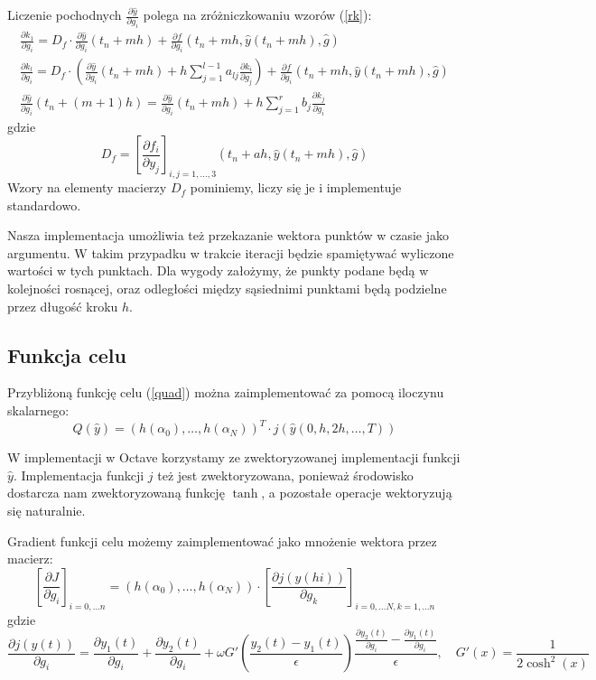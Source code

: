 \documentclass[11pt]{article}
\begin{document}
Liczenie pochodnych $\frac{\partial \hat{y}}{\partial g_i}$ polega na zróżniczkowaniu wzorów (\ref{rk}):
\begin{gather}
    \frac{\partial k_1}{\partial g_i} = D_f \cdot \frac{\partial \hat{y}}{\partial g_i}(t_n + mh) + \frac{\partial f}{\partial g_i}(t_n + mh, \hat{y}(t_n + mh), \hat{g}) \nonumber \\
    \frac{\partial k_l}{\partial g_i}  = D_f \cdot \left(\frac{\partial \hat{y}}{\partial g_i}(t_n + mh) + h\sum_{j=1}^{l-1} a_{lj}\frac{\partial k_i}{\partial g_j} \right) + \frac{\partial f}{\partial g_i}(t_n + mh, \hat{y}(t_n + mh), \hat{g})  \label{drk}\\
    \frac{\partial \hat{y}}{\partial g_i}(t_n + (m+1)h) = \frac{\partial \hat{y}}{\partial g_i}(t_n + mh) + h\sum_{j=1}^r b_j \frac{\partial k_j}{\partial g_i} \nonumber
\end{gather}
gdzie
\begin{equation} \label{Df}
  D_f = {\left[\frac{\partial f_i}{\partial y_j}\right]}_{i,j = 1,\ldots, 3} (t_n + ah, \hat{y}(t_n + mh), \hat{g})
\end{equation}
Wzory na elementy macierzy $D_f$ pominiemy, liczy się je i implementuje standardowo.

Nasza implementacja umożliwia też przekazanie wektora punktów w czasie jako argumentu. W takim przypadku w trakcie iteracji będzie spamiętywać wyliczone wartości w tych punktach. Dla wygody założymy, że punkty podane będą w kolejności rosnącej, oraz odległości między sąsiednimi punktami będą podzielne przez długość kroku $h$.

\subsection{Funkcja celu}
Przybliżoną funkcję celu (\ref{quad}) można zaimplementować za pomocą iloczynu skalarnego:
\begin{equation}
  Q(\hat{y}) = {\left(h(\alpha_0),\ldots,h(\alpha_N)\right)}^T \cdot {j(\hat{y}(0, h, 2h, \ldots, T))}
\end{equation}

W implementacji w Octave korzystamy ze zwektoryzowanej implementacji funkcji $\hat{y}$. Implementacja funkcji $j$ też jest zwektoryzowana, ponieważ środowisko dostarcza nam zwektoryzowaną funkcję $\tanh$, a pozostałe operacje wektoryzują się naturalnie.

Gradient funkcji celu możemy zaimplementować jako mnożenie wektora przez macierz:
\begin{equation}
  {\left[\frac{\partial J}{\partial g_i}\right]}_{i = 0, \ldots n} = \left(h(\alpha_0),\ldots,h(\alpha_N)\right) \cdot {\left[\frac{\partial j(\hat{y}(hi))}{\partial g_k}\right]}_{i = 0, \ldots N, k = 1, \ldots n}
\end{equation}
gdzie
\begin{equation}
  \frac{\partial j(y(t))}{\partial g_i} = \frac{\partial y_1(t)}{\partial g_i} + \frac{\partial y_2(t)}{\partial g_i} + \omega G'\left(\frac{y_2(t) - y_1(t)}{\epsilon}\right)\frac{\frac{\partial y_2(t)}{\partial g_i} - \frac{\partial y_1(t)}{\partial g_i}}{\epsilon},\quad G'(x) = \frac{1}{2\cosh^2(x)}
\end{equation}
\end{document}
